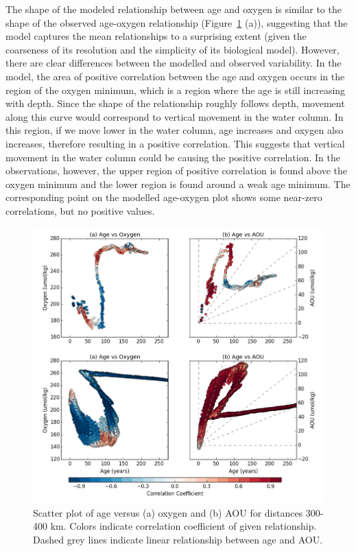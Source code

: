 The shape of the modeled relationship between age and oxygen is similar to the
shape of the observed age-oxygen relationship (Figure~\ref{fig:scatter_plots} (a)),
suggesting that the model captures the mean relationships to a surprising extent
(given the coarseness of its resolution and the simplicity of its biological model).
However, there are clear differences between the modelled and observed variability.
In the model, the area of positive correlation between the age and oxygen occurs
in the region of the oxygen minimum, which is a region where the age is still
increasing with depth. Since the shape of the relationship roughly follows depth,
movement along this curve would correspond to vertical movement in the water column.
In this region, if we move lower in the water column, age increases and oxygen also
increases, therefore resulting in a positive correlation. This suggests that vertical
movement in the water column could be causing the positive correlation. In the
observations, however, the upper region of positive correlation is found above the
oxygen minimum and the lower region is found around a weak age minimum. The
corresponding point on the modelled age-oxygen plot shows some near-zero correlations,
but no positive values.

\begin{figure}
\centering
\includegraphics[width=\linewidth]{age_aou_scatter.png}
\caption{Scatter plot of age versus (a) oxygen and (b) AOU for distances 300-400 km. Colors indicate correlation coefficient of given relationship. Dashed grey lines indicate linear relationship between age and AOU.}
\label{fig:scatter_plots}
\end{figure}

